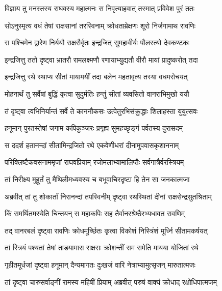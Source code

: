 
\twolineshloka
{विज्ञाय तु मनस्तस्य राघवस्य महात्मनः}
{स निवृत्याहवात् तस्मात् प्रविवेश पुरं ततः} %

\twolineshloka
{सोऽनुस्मृत्य वधं तेषां राक्षसानां तरस्विनाम्}
{क्रोधताम्रेक्षणः शूरो निर्जगामाथ रावणिः} %

\twolineshloka
{स पश्चिमेन द्वारेण निर्ययौ राक्षसैर्वृतः}
{इन्द्रजित् सुमहावीर्यः पौलस्त्यो देवकण्टकः} %

\twolineshloka
{इन्द्रजित्तु ततो दृष्ट्वा भ्रातरौ रामलक्ष्मणौ}
{रणायाभ्युुद्यतौ वीरौ मायां प्रादुष्करोत् तदा} %

\twolineshloka
{इन्द्रजित्तु रथे स्थाप्य सीतां मायामयीं तदा}
{बलेन महतावृत्य तस्या वधमरोचयत्} %

\twolineshloka
{मोहनार्थं तु सर्वेषां बुद्धिं कृत्वा सुदुर्मतिः}
{हन्तुं सीतां व्यवसितो वानराभिमुखो ययौ} %

\twolineshloka
{तं दृष्ट्वा त्वभिनिर्यान्तं सर्वे ते काननौकसः}
{उत्पेतुरभिसंक्रुद्धाः शिलाहस्ता युयुत्सवः} %

\twolineshloka
{हनूमान् पुरतस्तेषां जगाम कपिकुञ्जरः}
{प्रगृह्य सुमहच्छृङ्गं पर्वतस्य दुरासदम्} %

\twolineshloka
{स ददर्श हतानन्दां सीतामिन्द्रजितो रथे}
{एकवेणीधरां दीनामुपवासकृशाननाम्} %

\twolineshloka
{परिक्लिष्टैकवसनाममृजां राघवप्रियाम्}
{रजोमलाभ्यामालिप्तैः सर्वगात्रैर्वरस्त्रियम्} %

\twolineshloka
{तां निरीक्ष्य मुहूर्तं तु मैथिलीमध्यवस्य च}
{बभूवाचिरदृष्टा हि तेन सा जनकात्मजा} %

\twolineshloka
{अब्रवीत् तां तु शोकार्तां निरानन्दां तपस्विनीम्}
{दृष्ट्वा रथस्थितां दीनां राक्षसेन्द्रसुतश्रिताम्} %

\twolineshloka
{किं समर्थितमस्येति चिन्तयन् स महाकपिः}
{सह तैर्वानरश्रेष्ठैरभ्यधावत रावणिम्} %

\twolineshloka
{तद् वानरबलं दृष्ट्वा रावणिः क्रोधमूर्च्छितः}
{कृत्वा विकोशं निस्त्रिंशं मूर्ध्नि सीतामकर्षयत्} %

\twolineshloka
{तां स्त्रियं पश्यतां तेषां ताडयामास राक्षसः}
{क्रोशन्तीं राम रामेति मायया योजितां रथे} %

\twolineshloka
{गृहीतमूर्धजां दृष्ट्वा हनूमान् दैन्यमागतः}
{दुःखजं वारि नेत्राभ्यामुत्सृजन् मारुतात्मजः} %

\twolineshloka
{तां दृष्ट्वा चारुसर्वाङ्गीं रामस्य महिषीं प्रियाम्}
{अब्रवीत् परुषं वाक्यं क्रोधाद् रक्षोधिपात्मजम्} %

